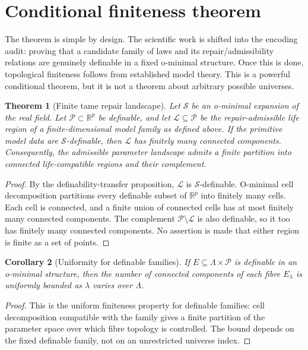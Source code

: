 \documentclass[11pt,a4paper]{article}
\newtheorem{theorem}{Theorem}[section]
\newtheorem{corollary}[theorem]{Corollary}
\theoremstyle{definition}
\theoremstyle{remark}
\newcommand{\R}{\mathbb{R}}
\newcommand{\ThetaSet}{\mathcal{P}}
\newcommand{\Life}{\mathcal{L}}
\newcommand{\cS}{\mathcal{S}}
\begin{document}
\section{Conditional finiteness theorem}
The theorem is simple by design. The scientific work is shifted into the encoding audit: proving that a candidate family of laws and its repair/admissibility relations are genuinely definable in a fixed o-minimal structure. Once this is done, topological finiteness follows from established model theory. This is a powerful conditional theorem, but it is not a theorem about arbitrary possible universes.

\begin{theorem}[Finite tame repair landscape]
Let \(\cS\) be an o-minimal expansion of the real field. Let \(\ThetaSet\subset\R^p\) be definable, and let \(\Life\subseteq\ThetaSet\) be the repair-admissible life region of a finite-dimensional model family as defined above. If the primitive model data are \(\cS\)-definable, then \(\Life\) has finitely many connected components. Consequently, the admissible parameter landscape admits a finite partition into connected life-compatible regions and their complement.
\end{theorem}
\begin{proof}
By the definability-transfer proposition, \(\Life\) is \(\cS\)-definable. O-minimal cell decomposition partitions every definable subset of \(\R^p\) into finitely many cells. Each cell is connected, and a finite union of connected cells has at most finitely many connected components. The complement \(\ThetaSet\setminus\Life\) is also definable, so it too has finitely many connected components. No assertion is made that either region is finite as a set of points.
\end{proof}

\begin{corollary}[Uniformity for definable families]
If \(E\subseteq\Lambda\times\ThetaSet\) is definable in an o-minimal structure, then the number of connected components of each fibre \(E_\lambda\) is uniformly bounded as \(\lambda\) varies over \(\Lambda\).
\end{corollary}
\begin{proof}
This is the uniform finiteness property for definable families: cell decomposition compatible with the family gives a finite partition of the parameter space over which fibre topology is controlled. The bound depends on the fixed definable family, not on an unrestricted universe index.
\end{proof}
\end{document}
